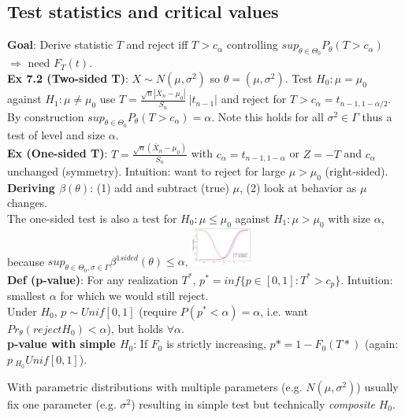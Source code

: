 \subsection{Test statistics and critical values}
\textbf{Goal}: Derive statistic $T$ and reject iff $T>c_\alpha$ controlling $sup_{\theta\in\Theta_0}P_\theta(T>c_\alpha)$ $\Rightarrow$ need $F_T(t)$.\\
\textbf{Ex 7.2 (Two-sided T)}: $X\sim N(\mu, \sigma^2)$ so $\theta = (\mu, \sigma^2)$. Test $H_0:\mu=\mu_0$ against $H_1:\mu\neq\mu_0$ use $T = \frac{\sqrt{n}|\bar{X}_n-\mu_0|}{S_n} ~ |t_{n-1}|$ and reject for $T > c_\alpha = t_{n-1, 1-\alpha/2}$. By construction $sup_{\theta\in\Theta_0}P_\theta(T>c_\alpha)=\alpha$. \footnotesize{Note this holds for all $\sigma^2\in\Gamma$ thus a test of level and size $\alpha$.}\\
\textbf{Ex (One-sided T)}: $T = \frac{\sqrt{n}(\bar{X}_n-\mu_0)}{S_n}$ with $c_\alpha = t_{n-1, 1-\alpha}$ or $Z = -T$ and $c_\alpha$ unchanged (symmetry). Intuition: want to reject for large $\mu > \mu_0$ (right-sided).\\
\textbf{Deriving $\beta(\theta)$}: (1) add and subtract (true) $\mu$, (2) look at behavior as $\mu$ changes. \\
The one-sided test is also a test for $H_0:\mu\leq\mu_0$ against $H_1:\mu>\mu_0$ with size $\alpha$, because $sup_{\theta\in\Theta_0, \sigma\in\Gamma}\beta^{1sided}(\theta)\leq\alpha$.
\includegraphics[width = 0.15\textwidth]{inhalt/power_curves.png}\\
\textbf{Def (p-value)}: For any realization $T^*$, $p^* = inf\{p\in[0,1]: T^*>c_p\}$. Intuition: smallest $\alpha$ for which we would still reject. \\\footnotesize{Under $H_0$, $p\sim Unif[0,1]$ (require $P(p^*<\alpha)=\alpha$, i.e. want $Pr_\theta(reject H_0) < \alpha$), but holds $\forall\alpha$.}\\
\textbf{p-value with simple $H_0$}: If $F_0$ is strictly increasing, $p* = 1 - F_0(T*)$ (again: $p~_{H_0}Unif[0,1]$).

\footnotesize{With parametric distributions with multiple parameters (e.g. $N(\mu, \sigma^2)$) usually fix one parameter (e.g. $\sigma^2$) resulting in simple test but technically \textit{composite} $H_0$.}

